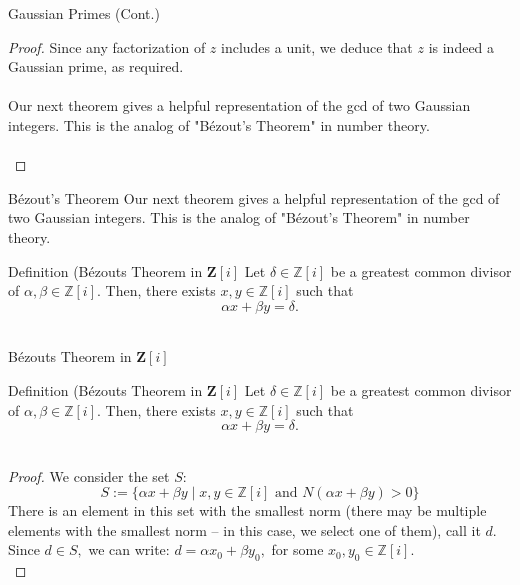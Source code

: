 \begin{frame}{Gaussian Primes (Cont.)}
    \begin{proof}
        Since any factorization of $z$ includes a unit, we deduce that $z$ is indeed a Gaussian prime, as required. \\\\
Our next theorem gives a helpful representation of the gcd of two Gaussian integers. This is the analog of "Bézout's Theorem" in number theory. \\\\
    \end{proof}
\end{frame}


\begin{frame}{Bézout’s Theorem}
    Our next theorem gives a helpful representation of the gcd of two Gaussian integers. This is the analog of "Bézout's Theorem" in number theory. 
    \begin{block}{Definition (Bézouts Theorem in $\mathbf{Z}[i]$}
    Let $\delta\in\mathbb{Z}[i]$ be a greatest common divisor of $\alpha,\beta\in\mathbb{Z}[i].$ Then, there exists $x,y\in\mathbb{Z}[i]$ such that $$\alpha x+\beta y=\delta.$$\\
    \end{block}

\end{frame}


\begin{frame}{Bézouts Theorem in $\mathbf{Z}[i]$}
    \begin{block}{Definition (Bézouts Theorem in $\mathbf{Z}[i]$}
    Let $\delta\in\mathbb{Z}[i]$ be a greatest common divisor of $\alpha,\beta\in\mathbb{Z}[i].$ Then, there exists $x,y\in\mathbb{Z}[i]$ such that $$\alpha x+\beta y=\delta.$$\\
    \end{block}
    
    \begin{proof}
    We consider the set $S:$
$$S:=\{\alpha x+\beta y \mid x,y\in\mathbb{Z}[i] \text{ and } N(\alpha x+\beta y)>0\}$$
There is an element in this set with the smallest norm (there may be multiple elements with the smallest norm -- in this case, we select one of them), call it $d.$ Since $d\in S,$ we can write:
$d=\alpha x_0 +\beta y_0,$ for some $x_0,y_0\in\mathbb{Z}[i].$\\
    \end{proof}
\end{frame}



